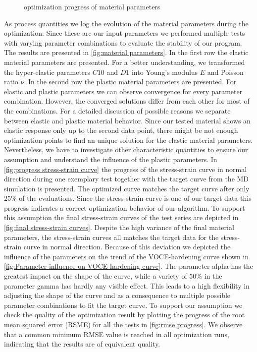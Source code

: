    \begin{figure}[H]
		\centering
		\def\svgwidth{0.7\textwidth}
        
		\caption{optimization progress of material parameters}
		\label{fig:material parameters}
	\end{figure}
    As process quantities we log the evolution of the material parameters during the optimization. Since these are our input parameters we performed multiple tests with varying parameter combinations to evaluate the stability of our program. The results are presented in \autoref{fig:material parameters}. In the first row the elastic material parameters are presented. For a better understanding, we transformed the hyper-elastic parameters \(C10\) and \(D1\) into Young's modulus \(E\) and Poisson ratio \(\nu\). In the second row the plastic material parameters are presented. For elastic and plastic parameters we can observe convergence for every parameter combination. However, the converged solutions differ from each other for most of the combinations. 
    For a detailed discussion of possible reasons we separate between elastic and plastic material behavior. Since our tested material shows an elastic response only up to the second data point, there might be not enough optimization points to find an unique solution for the elastic material parameters. Nevertheless, we have to investigate other characteristic quantities to ensure our assumption and understand the influence of the plastic parameters. In \autoref{fig:progress stress-strain curve} the progress of the stress-strain curve in normal direction during one exemplary test together with the target curve from the MD simulation is presented. The optimized curve matches the target curve after only  \(25 \%\) of the evaluations. Since the stress-strain curve is one of our target data this progress indicates a correct optimization behavior of our algorithm. To support this assumption the final stress-strain curves of the test series are depicted in \autoref{fig:final stress-strain curves}. Despite the high variance of the final material parameters, the stress-strain curves all matches the target data for the stress-strain curve in normal direction. Because of this deviation we depicted the influence of the parameters on the trend of the VOCE-hardening curve shown in \autoref{fig:Parameter influence on VOCE-hardening curve}. The parameter alpha has the greatest impact on the shape of the curve, while a variety of \(50\%\) in the parameter gamma has hardly any visible effect. This leads to a high flexibility in adjusting the shape of the curve and as a consequence to multiple possible parameter combinations to fit the target curve. To support our assumption we check the quality of the optimization result by plotting the progress of the root mean squared error (RSME) for all the tests in \autoref{fig:rmse progress}. We observe that a common minimum RMSE value is reached in all optimization runs, indicating that the results are of equivalent quality. 
